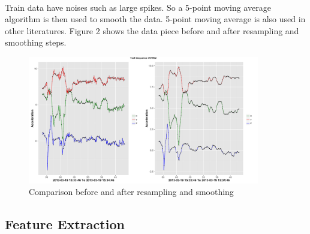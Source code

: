 \documentclass{article}
\begin{document}
		\paragraph{} Train data have noises such as large spikes. So a 5-point moving average algorithm is then used to smooth the data. 5-point moving average is also used in other literatures. Figure 2 shows the data piece before and after resampling and smoothing steps.
		\begin{figure}
			\centering
			\includegraphics[width=0.9\textwidth]{Rplot.pdf}
			\caption{Comparison before and after resampling and smoothing}
		\end{figure}
	
	
		\subsection{Feature Extraction} %
		\label{sub:feature_extraction}
		
\end{document}
